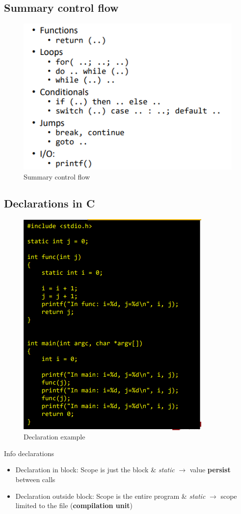 \documentclass[a4paper,10pt]{article}
\begin{document}
\subsection{Summary control flow}
\begin{figure}[h!]
    \centering
    \includegraphics[width=0.7\linewidth]{Pictures/e8.png}
    \caption{Summary control flow}
    \label{fig:enter-label}
\end{figure}

\pagebreak
\subsection{Declarations in C}
\begin{figure}[!h]
    \centering
    \includegraphics[width=0.75\linewidth]{Pictures/e9.png}
    \caption{Declaration example}
    \label{fig:enter-label}
\end{figure}
\begin{tipbox}
    {Info declarations}
    \begin{itemize}
        \item Declaration in block: Scope is just the block \& \textit{static} $\rightarrow$ value \textbf{persist} between calls
        \item Declaration outside block: Scope is the entire program \& \textit{static} $\rightarrow$ scope limited to the file (\textbf{compilation unit})
    \end{itemize}
\end{tipbox}
\end{document}
